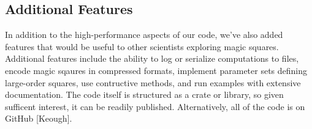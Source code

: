 \documentclass{rhumj_new}
\begin{document}
\subsection{Additional Features}

In addition to the high-performance aspects of our code, we've also added features that would
be useful to other scientists exploring magic squares. Additional features include the ability to
log or serialize computations to files, encode magic sqaures in compressed formats, implement
parameter sets defining large-order squares, use contructive methods, and run examples with
extensive documentation. The code itself is structured as a crate or library, so given sufficent
interest, it can be readily published. Alternatively, all of the code is on GitHub [Keough].



\end{document}
